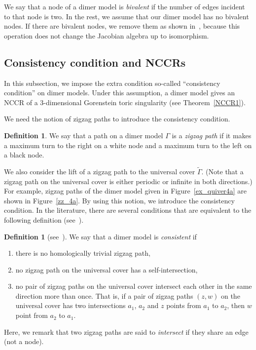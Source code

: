 \documentclass[11pt]{amsart}
\theoremstyle{definition}
\newtheorem{defi}[theo]{Definition}
\begin{document}
We say that a node of a dimer model is \emph{bivalent} if the number of edges incident to that node is two. In the rest, we assume that our dimer model has no bivalent nodes. If there are bivalent nodes, we remove them as shown in~\cite[Figure~5.1]{IU1}, because this operation does not change the Jacobian algebra up to isomorphism.


\subsection{Consistency condition and NCCRs}\label{sec_consist}

In this subsection, we impose the extra condition so-called ``consistency condition'' on dimer models. Under this assumption, a dimer model gives an NCCR of a $3$-dimensional Gorenstein toric singularity (see Theorem~\ref{NCCR1}).

We need the notion of zigzag paths to introduce the consistency condition.

\begin{defi}
We say that a path on a dimer model $\Gamma$ is a \emph{zigzag path} if it makes a maximum turn to the right on a white node and a maximum turn to the left on a black node.
\end{defi}

We also consider the lift of a zigzag path to the universal cover $\widetilde{\Gamma}$. (Note that a zigzag path on the universal cover is either periodic or infinite in both directions.) For example, zigzag paths of the dimer model given in Figure~\ref{ex_quiver4a} are shown in Figure~\ref{zz_4a}. By using this notion, we introduce the consistency condition. In the literature, there are several conditions that are equivalent to the following definition (see~\cite{Boc1,IU1}).

\begin{defi}[{see~\cite[Definition~3.5]{IU1}}]\label{def_consistent}
We say that a dimer model is \emph{consistent} if
\begin{enumerate}[\rm(1)]
\item there is no homologically trivial zigzag path,
\item no zigzag path on the universal cover has a self-intersection,
\item no pair of zigzag paths on the universal cover intersect each other in the same direction more than once. That is, if a pair of zigzag paths $(z,w)$ on the universal cover has two intersections $a_1$, $a_2$ and $z$ points from $a_1$ to $a_2$, then $w$ point from $a_2$ to $a_1$.
\end{enumerate}
Here, we remark that two zigzag paths are said to \emph{intersect} if they share an edge (not a node).
\end{defi}
\end{document}
